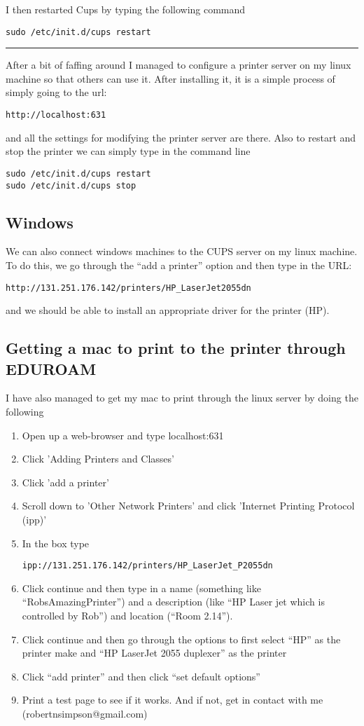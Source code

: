 \documentclass[a4paper, 10pt]{article}
\newcommand{\mybotrule}{\vspace{4mm}\hrule}
\begin{document}
I then restarted Cups by typing the following command
\begin{verbatim}
sudo /etc/init.d/cups restart
\end{verbatim}

\mybotrule

After a bit of faffing around I managed to configure a printer server on my linux machine so that others can use it. After installing it, it is a simple process of simply going to the url:
\begin{verbatim}
http://localhost:631
\end{verbatim}
and all the settings for modifying the printer server are there. Also to restart and stop the printer we can simply type in the command line
\begin{verbatim}
sudo /etc/init.d/cups restart
sudo /etc/init.d/cups stop
\end{verbatim}

\subsection*{Windows}
We can also connect windows machines to the CUPS server on my linux machine. To do this, we go through the ``add a printer'' option and then type in the URL:
\begin{verbatim}
http://131.251.176.142/printers/HP_LaserJet2055dn
\end{verbatim}
and we should be able to install an appropriate driver for the printer (HP).
%

\subsection*{Getting a mac to print to the printer through EDUROAM}

I have also managed to get my mac to print through the linux server by doing the following
\begin{enumerate}
\item Open up a web-browser and type localhost:631
\item Click 'Adding Printers and Classes'
\item Click 'add a printer'
\item Scroll down to 'Other Network Printers' and click 'Internet Printing Protocol (ipp)'
\item In the box type 
\begin{verbatim}
ipp://131.251.176.142/printers/HP_LaserJet_P2055dn
\end{verbatim}
\item Click continue and then type in a name (something like ``RobsAmazingPrinter'') and a description (like ``HP Laser jet which is controlled by Rob'') and location (``Room 2.14'').
\item Click continue and then go through the options to first select ``HP'' as the printer make and ``HP LaserJet 2055 duplexer'' as the printer
\item Click ``add printer'' and then click ``set default options''
\item Print a test page to see if it works. And if not, get in contact with me (robertnsimpson@gmail.com) 
\end{enumerate}
\end{document}
